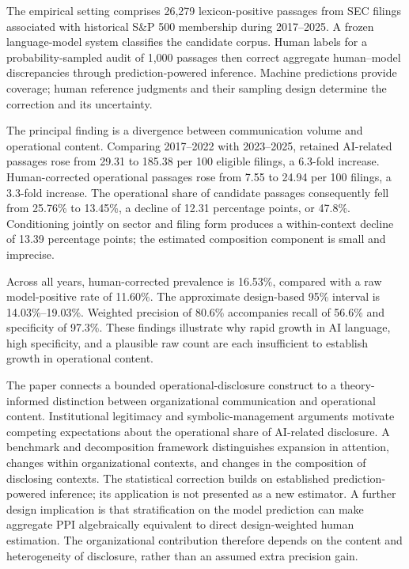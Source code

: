 \documentclass[12pt]{article}
\begin{document}
The empirical setting comprises 26,279 lexicon-positive passages from SEC
filings associated with historical S\&P 500 membership during 2017--2025.
A frozen language-model system classifies the candidate corpus. Human labels
for a probability-sampled audit of 1,000 passages then correct aggregate
human--model discrepancies through prediction-powered inference. Machine
predictions provide coverage; human reference judgments and their sampling
design determine the correction and its uncertainty.

The principal finding is a divergence between communication volume and
operational content. Comparing 2017--2022 with 2023--2025, retained
AI-related passages rose from 29.31 to 185.38 per 100 eligible filings, a
6.3-fold increase. Human-corrected operational passages rose from 7.55 to
24.94 per 100 filings, a 3.3-fold increase. The operational share of candidate
passages consequently fell from 25.76\% to 13.45\%, a decline of 12.31
percentage points, or 47.8\%. Conditioning jointly on sector and filing form
produces a within-context decline of 13.39 percentage points; the estimated
composition component is small and imprecise.

Across all years, human-corrected prevalence is 16.53\%, compared with a raw
model-positive rate of 11.60\%. The approximate design-based 95\% interval is
14.03\%--19.03\%. Weighted precision of 80.6\% accompanies recall of 56.6\%
and specificity of 97.3\%. These findings illustrate why rapid growth in AI
language, high specificity, and a plausible raw count are each insufficient
to establish growth in operational content.

The paper connects a bounded operational-disclosure construct to a
theory-informed distinction between organizational communication and
operational content. Institutional legitimacy and symbolic-management
arguments motivate competing expectations about the operational share of
AI-related disclosure. A benchmark and decomposition framework distinguishes
expansion in attention, changes within organizational contexts, and changes
in the composition of disclosing contexts.
The statistical correction builds on established prediction-powered inference;
its application is not presented as a new estimator. A further design
implication is that stratification on the model prediction can make aggregate
PPI algebraically equivalent to direct design-weighted human estimation.
The organizational contribution therefore depends on the content and
heterogeneity of disclosure, rather than an assumed extra precision gain.
\end{document}
